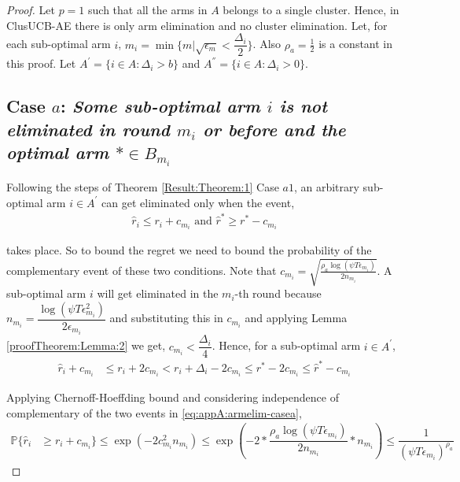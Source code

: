 \begin{proof}
Let $p=1$ such that all the arms in $A$ belongs to a single cluster. Hence, in ClusUCB-AE there is only arm elimination and no cluster elimination. Let, for each sub-optimal arm ${i}$, $m_{i}=\min{\lbrace m|\sqrt{\epsilon_{m}} < \dfrac{\Delta_{i}}{2} \rbrace}$. Also $\rho_{a}=\frac{1}{2}$ is a constant in this proof. Let $A^{'}=\lbrace i\in A: \Delta_{i} > b \rbrace$ and $A^{''}=\lbrace i\in A: \Delta_{i} > 0 \rbrace$. 


\subsection*{Case $a$: \textit{Some sub-optimal arm ${i}$ is not eliminated in round $m_{i}$ or before and the optimal arm ${*}\in B_{m_{i}}$}}
  
	Following the steps of Theorem \ref{Result:Theorem:1} Case $a1$, an arbitrary sub-optimal arm ${i}\in A^{'}$ can get eliminated only when the event,
	\begin{align}
	\hat{r}_{i}  \le r_{i} + c_{m_i} \text{ and } \label{eq:appA:armelim-casea}
 	\hat{r}^{*}\geq  r^{*} - c_{m_i}
	\end{align}
	
	takes place. So to bound the regret we need to bound the probability of the complementary event of these two conditions. Note that  $c_{m_{i}} = \sqrt{\frac{\rho_{a}\log (\psi T\epsilon_{m_{i}})}{2 n_{m_i}}}$. A sub-optimal arm $i$ will get eliminated in the $m_i$-th round because $n_{m_{i}}=\dfrac{\log{(\psi T\epsilon_{m_{i}}^{2})}}{2\epsilon_{m_{i}}}$ and substituting this in $c_{m_i}$ and applying Lemma \ref{proofTheorem:Lemma:2} we get, $c_{m_i} < \dfrac{\Delta_{i}}{4} $. Hence, for a sub-optimal arm ${i} \in A^{'}$, 
  \begin{align*}
\hat{r}_{i} + c_{m_i}&\leq r_{i} + 2c_{m_i} 
 < r_{i} + \Delta_{i} - 2c_{m_i}
 \leq r^{*} -2c_{m_i} 
 \leq \hat{r}^{*} - c_{m_i}
  \end{align*}

	Applying Chernoff-Hoeffding bound and considering independence of complementary of the two events in \ref{eq:appA:armelim-casea},
  \begin{align*}
\mathbb{P}\lbrace\hat{r}_{i}&\geq r_{i} + c_{m_i}\rbrace\leq \exp(-2c_{m_i}^{2}n_{m_{i}})
\leq \exp(-2 * \dfrac{\rho_{a}\log (\psi T\epsilon_{m_{i}})}{2 n_{m_{i}}} *n_{m_{i}})
\leq \dfrac{1}{(\psi T\epsilon_{m_{i}})^{\rho_{a}}}   
  \end{align*}
 

\end{proof}
